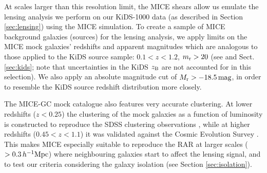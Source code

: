 \documentclass[usenatbib]{mnras}
\newcommand{\hMpc}{\, h^{-1}{\rm{Mpc}} }
\newcommand{\un}[1]{_{\rm #1}}
\begin{document}
At scales larger than this resolution limit, the MICE shears allow us emulate the lensing analysis we perform on our KiDS-1000 data (as described in Section \ref{sec:lensing}) using the MICE simulation. To create a sample of MICE background galaxies (sources) for the lensing analysis, we apply limits on the MICE mock galaxies' redshifts and apparent magnitudes which are analogous to those applied to the KiDS source sample: $0.1 < z < 1.2$, $m\un{r}>20$ (see \citealp{hildebrandt2017} and Sect. \ref{sec:kids}; note that uncertainties in the KiDS $z\un{B}$ are not accounted for in this selection). We also apply an absolute magnitude cut of $M\un{r}>-18.5 \, {\rm mag}$, in order to resemble the KiDS source redshift distribution more closely.

The MICE-GC mock catalogue also features very accurate clustering. At lower redshifts ($z<0.25$) the clustering of the mock galaxies as a function of luminosity is constructed to reproduce the SDSS clustering observations \cite[]{zehavi2011}, while at higher redshifts ($0.45<z<1.1$) it was validated against the Cosmic Evolution Survey \cite[COSMOS,][]{ilbert2009}. This makes MICE especially suitable to reproduce the RAR at larger scales ($>0.3\hMpc$) where neighbouring galaxies start to affect the lensing signal, and to test our criteria considering the galaxy isolation (see Section \ref{sec:isolation}).



\end{document}
